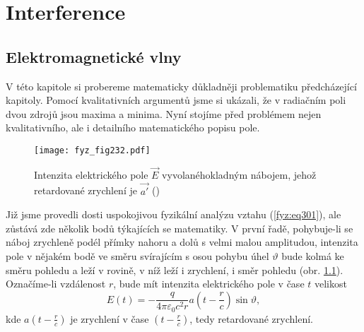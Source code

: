 {
\chapter{Interference}\label{fyz:IchapXXIX}
\minitoc
  \section{Elektromagnetické vlny}\label{fyz:IchapXXIXsecI}
    V této kapitole si probereme matematicky důkladněji problematiku předcházející kapitoly. Pomocí 
    kvalitativních argumentů jsme si ukázali, že v radiačním poli dvou zdrojů jsou maxima a minima. 
    Nyní stojíme před problémem nejen kvalitativního, ale i detailního matematického popisu pole.
    
    \begin{figure}[ht!] %
      \centering
      \texttt{[image: fyz\_fig232.pdf]}
      \caption{Intenzita elektrického pole \(\vec{E}\) vyvolanéhokladným nábojem, jehož retardované 
               zrychlení je \(\vec{a'}\)
               (\cite[s.~379]{Feynman01})}
      \label{fyz:fig232}
    \end{figure}
    
    Již jsme provedli dosti uspokojivou fyzikální analýzu vztahu (\ref{fyz:eq301}), ale zůstává zde 
    několik  bodů týkajících se matematiky. V první řadě, pohybuje-li se náboj zrychleně podél 
    přímky nahoru a dolů s velmi malou amplitudou, intenzita pole v nějakém bodě ve směru 
    svírajícím s osou pohybu úhel \(\vartheta\) bude kolmá ke směru pohledu a leží v rovině, v níž 
    leží i zrychlení, i směr pohledu (obr. \ref{fyz:fig232}). Označíme-li vzdálenost \(r\), bude 
    mít intenzita elektrického pole v čase \(t\) velikost
    \begin{equation}\label{fyz:eq302}
      E(t) = -\frac{q}{4\pi\varepsilon_0c^2r}a\left(t-\frac{r}{c}\right)\sin\vartheta,
    \end{equation}
    kde \(a\left(t-\frac{r}{c}\right)\) je zrychlení v čase \(\left(t-\frac{r}{c}\right)\), tedy 
    retardované zrychlení.
    
}
